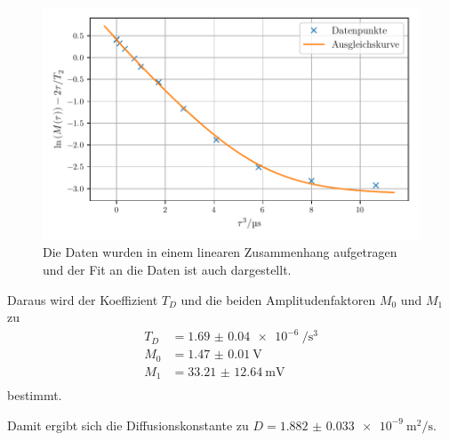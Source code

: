 

\begin{figure}
    \centering
    \includegraphics[width=\textwidth]{plots/echo.pdf}
    \caption{Die Daten wurden in einem linearen Zusammenhang aufgetragen und der Fit an die Daten ist auch dargestellt.}
    \label{abb:echo}
\end{figure}

Daraus wird der Koeffizient $T_D$ und die beiden Amplitudenfaktoren $M_0$ und $M_1$ zu 
\begin{align*}
T_D &= \SI{1.69(4)e-6}{\per\second\tothe{3}} \\
M_0 &= \SI{1.47(1)}{\volt} \\
M_1 &= \SI{33.21(1264)}{\milli\volt} \\
\end{align*}
bestimmt.

Damit ergibt sich die Diffusionskonstante zu $D = \SI{1.882(33)e-9}{\meter\squared\per\second}$.
